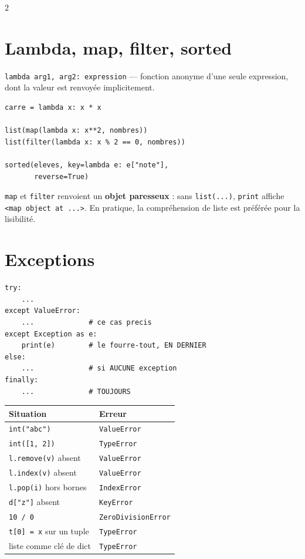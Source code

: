 \documentclass[a4paper,10pt]{article}
\newcommand{\co}[1]{\texttt{\textcolor{codefg}{#1}}}
\begin{document}
\begin{multicols}{2}
\section{Lambda, map, filter, sorted}

\co{lambda arg1, arg2: expression} --- fonction anonyme d'une seule
expression, dont la valeur est renvoyée implicitement.

\begin{lstlisting}
carre = lambda x: x * x

list(map(lambda x: x**2, nombres))
list(filter(lambda x: x % 2 == 0, nombres))

sorted(eleves, key=lambda e: e["note"],
       reverse=True)
\end{lstlisting}

\co{map} et \co{filter} renvoient un \textbf{objet paresseux} : sans
\co{list(...)}, \co{print} affiche \co{<map object at ...>}. En pratique, la
compréhension de liste est préférée pour la lisibilité.

\section{Exceptions}

\begin{lstlisting}
try:
    ...
except ValueError:
    ...             # ce cas precis
except Exception as e:
    print(e)        # le fourre-tout, EN DERNIER
else:
    ...             # si AUCUNE exception
finally:
    ...             # TOUJOURS
\end{lstlisting}

\begin{tabularx}{\linewidth}{@{}l>{\raggedright\arraybackslash}X@{}}
\toprule
\textbf{Situation} & \textbf{Erreur} \\
\midrule
\co{int("abc")}            & \co{ValueError} \\
\co{int([1, 2])}           & \co{TypeError} \\
\co{l.remove(v)} absent    & \co{ValueError} \\
\co{l.index(v)} absent     & \co{ValueError} \\
\co{l.pop(i)} hors bornes  & \co{IndexError} \\
\co{d["z"]} absent         & \co{KeyError} \\
\co{10 / 0}                & \co{ZeroDivisionError} \\
\co{t[0] = x} sur un tuple & \co{TypeError} \\
liste comme clé de dict    & \co{TypeError} \\
\bottomrule
\end{tabularx}


\end{multicols}
\end{document}
